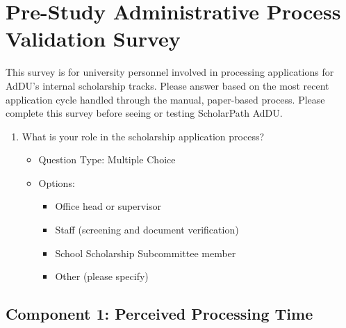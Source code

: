 \chapter{Pre-Study Administrative Process Validation Survey}
\label{app:pre-admin-survey}

This survey is for university personnel involved in processing applications for AdDU's internal scholarship tracks. Please answer based on the most recent application cycle handled through the manual, paper-based process. Please complete this survey before seeing or testing ScholarPath AdDU.

\begin{enumerate}[series=q, label={Question \arabic*:}, leftmargin=*, align=left]
  \item What is your role in the scholarship application process?
  \begin{itemize}[leftmargin=*]
    \item Question Type: Multiple Choice
    \item Options:
    \begin{itemize}[leftmargin=*]
      \item Office head or supervisor
      \item Staff (screening and document verification)
      \item School Scholarship Subcommittee member
      \item Other (please specify)
    \end{itemize}
  \end{itemize}
\end{enumerate}

\section{Component 1: Perceived Processing Time}

